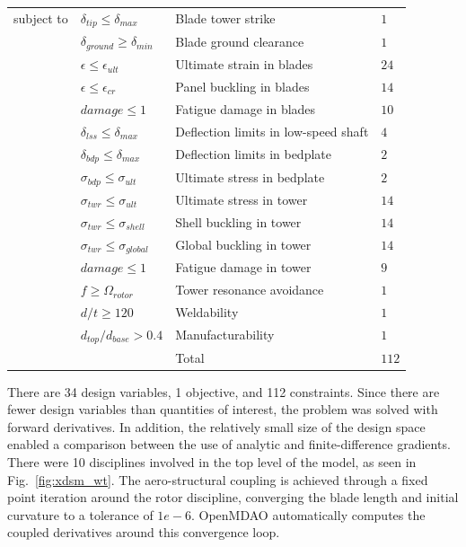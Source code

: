 \documentclass[]{aiaa-tc} %
\begin{document}
\begin{table}
\begin{tabular}{r l l l}
            \\
            subject to          & $\delta_{tip} \le \delta_{max}$ & Blade tower strike & $1$ \\
                                    & $\delta_{ground} \ge \delta_{min}$ & Blade ground clearance & $1$ \\
                                    & $\epsilon \le \epsilon_{ult}$ & Ultimate strain in blades & $24$ \\
                                    & $\epsilon \le \epsilon_{cr}$ & Panel buckling in blades & $14$ \\
                                    & $damage \le 1$ & Fatigue damage in blades & $10$ \\
                                    & $\delta_{lss} \le \delta_{max}$ & Deflection limits in low-speed shaft & $4$ \\
                                    & $\delta_{bdp} \le \delta_{max}$ & Deflection limits in bedplate & $2$ \\
                                    & $\sigma_{bdp} \le \sigma_{ult}$ & Ultimate stress in bedplate & $2$ \\
                                    & $\sigma_{twr} \le \sigma_{ult}$ & Ultimate stress in tower & $14$ \\
                                    & $\sigma_{twr} \le \sigma_{shell}$ & Shell buckling in tower & $14$ \\
                                    & $\sigma_{twr} \le \sigma_{global}$ & Global buckling in tower & $14$ \\
                                    & $damage \le 1$ & Fatigue damage in tower & $9$ \\
                                    & $f \ge \Omega_{rotor}$ & Tower resonance avoidance & $1$ \\
                                    & $d/t \ge 120$ & Weldability & $1$ \\
                                    & $d_{top}/d_{base} > 0.4$ & Manufacturability & $1$ \\
                                    & & Total & $112$ \\
            \hline
        \end{tabular}
        \label{tab:coe_formulation}
    \end{table}


    There are 34 design variables, 1 objective, and 112 constraints. Since there are
    fewer design variables than quantities of interest, the problem was solved with
    forward derivatives. In addition, the relatively small size of the design space
    enabled a comparison between the use of analytic and finite-difference gradients. There were 10 disciplines 
    involved in the top level of the model, as seen in Fig.~\ref{fig:xdsm_wt}. The aero-structural coupling 
    is achieved through a fixed point iteration around the rotor discipline, converging the blade length and 
    initial curvature to a tolerance of $1e-6$. OpenMDAO automatically computes the coupled derivatives around 
    this convergence loop. 
\end{document}
